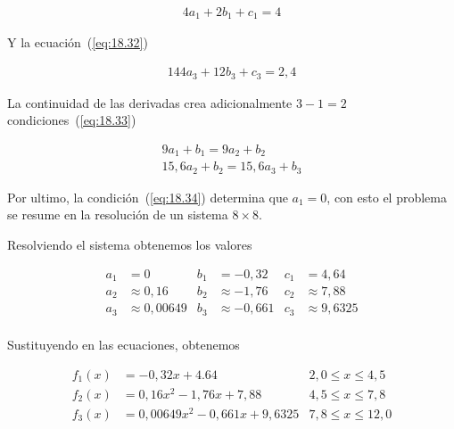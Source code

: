 \documentclass[conference]{IEEEtran}
\begin{document}
\begin{align*}
	4a_{1} + 2b_{1} + c_{1} = 4
\end{align*}

Y la ecuación~(\ref{eq:18.32})

\begin{align*}
	144a_{3} + 12b_{3} + c_{3} = 2,4
\end{align*}

La continuidad de las derivadas crea adicionalmente $3 - 1 = 2$ condiciones~(\ref{eq:18.33})

\begin{align*}
	9a_{1} + b_{1} = 9a_{2} + b_{2} \\
	15,6a_{2} + b_{2} = 15,6a_{3} + b_{3}
\end{align*}

Por ultimo, la condición~(\ref{eq:18.34}) determina que $a_{1} = 0$, con esto
el problema se resume en la resolución de un sistema $8 \times 8$.

Resolviendo el sistema obtenemos los valores

\begin{align*}
	a_{1} & = 0             & b_{1} & = -0,32        & c_{1} & = 4,64         \\
	a_{2} & \approx  0,16   & b_{2} & \approx -1,76  & c_{2} & \approx 7,88   \\
	a_{3} & \approx 0,00649 & b_{3} & \approx -0,661 & c_{3} & \approx 9,6325 \\
\end{align*}

Sustituyendo en las ecuaciones, obtenemos

\begin{align*}
	f_{1}(x) & = -0,32x + 4.64                  & 2,0 \leq x \leq 4,5  \\
	f_{2}(x) & = 0,16x^{2} - 1,76x + 7,88       & 4,5 \leq x \leq 7,8  \\
	f_{3}(x) & = 0,00649x^{2} - 0,661x + 9,6325 & 7,8 \leq x \leq 12,0
\end{align*}


\end{document}
